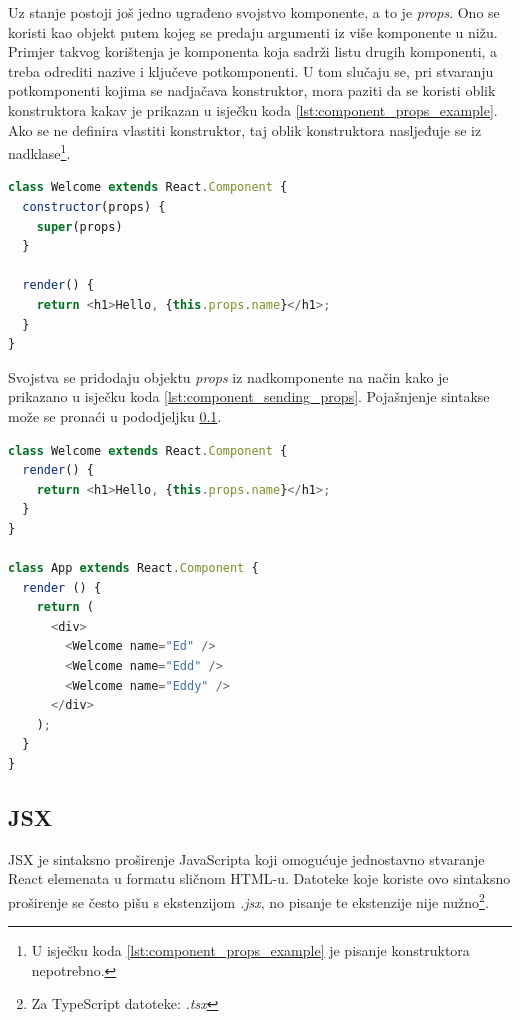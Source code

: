 \documentclass[times, utf8, zavrsni, numeric]{fer}
\newcommand{\razmakp}{\vspace{18pt}}
\newcommand{\razmaks}{\vspace{10pt}}
\begin{document}
\razmakp
\razmakp

Uz stanje postoji još jedno ugrađeno svojstvo komponente, a to je \emph{props}\citep{reactDocsComp&Props}.
Ono se koristi kao objekt putem kojeg se predaju argumenti iz više komponente u nižu.
Primjer takvog korištenja je komponenta koja sadrži listu drugih komponenti, a treba odrediti nazive i ključeve potkomponenti.
U tom slučaju se, pri stvaranju potkomponenti kojima se nadjačava konstruktor, mora paziti da se koristi oblik konstruktora kakav je prikazan u isječku koda \ref{lst:component_props_example}.
Ako se ne definira vlastiti konstruktor, taj oblik konstruktora nasljeđuje se iz nadklase\footnote{U isječku koda \ref{lst:component_props_example} je pisanje konstruktora nepotrebno.}.

\razmakp
\begin{lstlisting}[language=JavaScript, caption={Primjer komponente s \emph{props}}, label={lst:component_props_example}]
class Welcome extends React.Component {
  constructor(props) {
    super(props)
  }

  render() {
    return <h1>Hello, {this.props.name}</h1>;
  }
}
\end{lstlisting}
\razmaks

Svojstva se pridodaju objektu \emph{props} iz nadkomponente na način kako je prikazano u isječku koda \ref{lst:component_sending_props}.
Pojašnjenje sintakse može se pronaći u pododjeljku \ref{sec:jsx}.

\razmakp
\begin{lstlisting}[language=JavaScript, caption={Primjer korištenja \emph{props}}, label={lst:component_sending_props}]
class Welcome extends React.Component {
  render() {
    return <h1>Hello, {this.props.name}</h1>;
  }
}

class App extends React.Component {
  render () {
    return (
      <div>
        <Welcome name="Ed" />
        <Welcome name="Edd" />
        <Welcome name="Eddy" />
      </div>
    );
  }
}
\end{lstlisting}
\razmaks


\subsection{JSX} \label{sec:jsx}

JSX je sintaksno proširenje JavaScripta koji omogućuje jednostavno stvaranje React elemenata u formatu sličnom HTML-u.
Datoteke koje koriste ovo sintaksno proširenje se često pišu s ekstenzijom \glqq \emph{ .jsx}\grqq , no pisanje te ekstenzije nije nužno\footnote{Za TypeScript datoteke: \glqq \emph{ .tsx}\grqq }.
\end{document}
